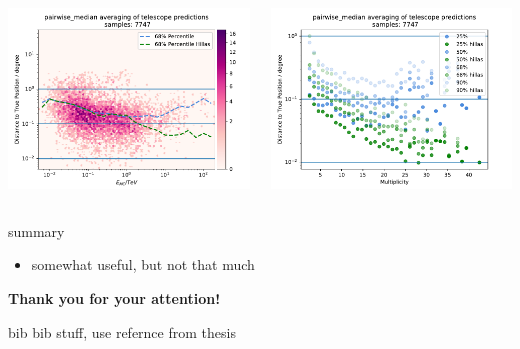 \documentclass[aspectratio=1610, 9pt]{beamer}
\begin{document}
\begin{frame}
  \begin{columns}[T]
    \begin{column}{.45\textwidth}
      \includegraphics[width=\textwidth]{../analysis/plots/gamma/pairwise_median_100_vs_energy.pdf}
    \end{column}
    \begin{column}{.45\textwidth}
      \includegraphics[width=\textwidth]{../analysis/plots/gamma/pairwise_median_100_vs_multi_comp.pdf}
    \end{column} 
  \end{columns}
\end{frame}

\begin{frame}{summary}
  \begin{itemize}
    \item somewhat useful, but not that much
  \end{itemize}
\end{frame}

\begin{frame}
    \centering
    {\Huge \textbf{Thank you for your attention!}}
\end{frame}

\begin{frame}{bib}
  bib stuff, use refernce from thesis 
\end{frame}
\end{document}
